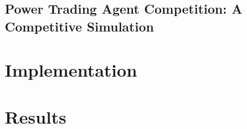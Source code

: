 

\section{Power Trading Agent Competition: A Competitive Simulation}


\chapter{Implementation}


\chapter{Results}


